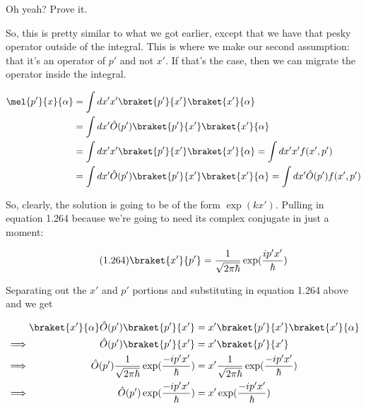 \begin{answer}
\begin{answerpart}{Oh yeah?  Prove it.}
\begin{answerspart}
      So, this is pretty similar to what we got earlier, except that
      we have that pesky operator outside of the integral.  This is
      where we make our second assumption: that it's an operator of
      $p'$ and not $x'$.  If that's the case, then we can migrate the
      operator inside the integral.
      
      \begin{equation}
        \begin{split}
          \mel{p'}{x}{\alpha}
          &=\int dx' x'\braket{p'}{x'}\braket{x'}{\alpha}\\
          &=\int dx' \hat{O}(p')\braket{p'}{x'}\braket{x'}{\alpha}\\
          &=\int dx' x'\braket{p'}{x'}\braket{x'}{\alpha} = \int dx' x'f(x', p')\\
          &=\int dx' \hat{O}(p')\braket{p'}{x'}\braket{x'}{\alpha} = \int dx' \hat{O}(p')f(x', p')\\
        \end{split}
      \end{equation}

      So, clearly, the solution is going to be of the form
      $\exp(kx')$.  Pulling in equation 1.264 because we're going to
      need its complex conjugate in just a moment:

      \begin{equation}
        \tag{1.264}
        \braket{x'}{p'} = \frac{1}{\sqrt{2\pi\hbar}} \exp(\frac{ip'x'}{\hbar})
      \end{equation}

      Separating out the $x'$ and $p'$ portions and substituting in
      equation 1.264 above and we get

      \begin{equation}
        \begin{alignedat}{2}
          & &
          \braket{x'}{\alpha}\hat{O}(p')\braket{p'}{x'}
          &= x'\braket{p'}{x'}\braket{x'}{\alpha}\\
          \implies & &
          \hat{O}(p')\braket{p'}{x'}
          &= x'\braket{p'}{x'}\\
          \implies & &
          \hat{O}(p')\frac{1}{\sqrt{2\pi\hbar}}\exp(\frac{-ip'x'}{\hbar})
          &= x'\frac{1}{\sqrt{2\pi\hbar}}\exp(\frac{-ip'x'}{\hbar})\\
          \implies & &
          \hat{O}(p')\exp(\frac{-ip'x'}{\hbar})
          &= x'\exp(\frac{-ip'x'}{\hbar})\\
        \end{alignedat}
      \end{equation}


\end{answerspart}
\end{answerpart}
\end{answer}
